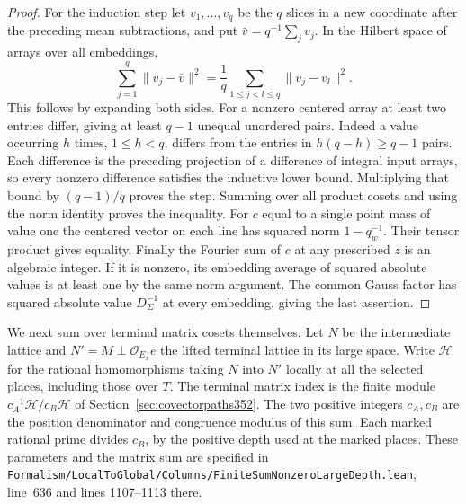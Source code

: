 \documentclass[a4paper,11pt]{article}
\theoremstyle{definition}
\theoremstyle{remark}
\newcommand{\srcloc}[2]{{\small\nolinkurl{#1.lean}}, line~#2}
\numberwithin{equation}{section}
\begin{document}
\begin{proof}
For the induction step let \(v_1,\ldots,v_q\) be the \(q\)
slices in a new coordinate after the preceding mean
subtractions, and put \(\bar v=q^{-1}\sum_jv_j\). In the
Hilbert space of arrays over all embeddings,
\[
       \sum_{j=1}^{q}\|v_j-\bar v\|^2
             =\frac1q\sum_{1\le j<l\le q}\|v_j-v_l\|^2 .
\]
This follows by expanding both sides. For a nonzero centered
array at least two entries differ, giving at least \(q-1\)
unequal unordered pairs. Indeed a value occurring \(h\) times,
\(1\le h<q\), differs from the entries in \(h(q-h)\ge q-1\)
pairs. Each difference is the preceding projection of a
difference of integral input arrays, so every nonzero
difference satisfies the inductive lower bound. Multiplying
that bound by \((q-1)/q\) proves the step. Summing over all
product cosets and using the norm identity proves the inequality.
For \(c\) equal to a single point mass of value one the
centered vector on each line has squared norm \(1-q_w^{-1}\).
Their tensor product gives equality. Finally the Fourier sum
of \(c\) at any prescribed \(z\) is an algebraic integer.
If it is nonzero, its embedding average of squared absolute
values is at least one by the same norm argument. The common
Gauss factor has squared absolute value \(D_\Sigma^{-1}\)
at every embedding, giving the last assertion.
\end{proof}

We next sum over terminal matrix cosets themselves. Let \(N\)
be the intermediate lattice and \(N'=M\perp\mathcal O_{E_x}e\)
the lifted terminal lattice in its large space. Write
\(\mathcal H\) for the rational homomorphisms taking \(N\)
into \(N'\) locally at all the selected places, including
those over \(T\). The terminal matrix index is the finite
module \(c_A^{-1}\mathcal H/c_B\mathcal H\) of
Section~\ref{sec:covectorpaths352}. The two positive
integers \(c_A,c_B\) are the position denominator and
congruence modulus of this sum. Each marked rational prime
divides \(c_B\), by the positive depth used at the marked
places. These parameters and the matrix sum are specified in
\srcloc{Formalism/LocalToGlobal/Columns/FiniteSumNonzeroLargeDepth}{636}
and lines 1107--1113 there.
\end{document}
